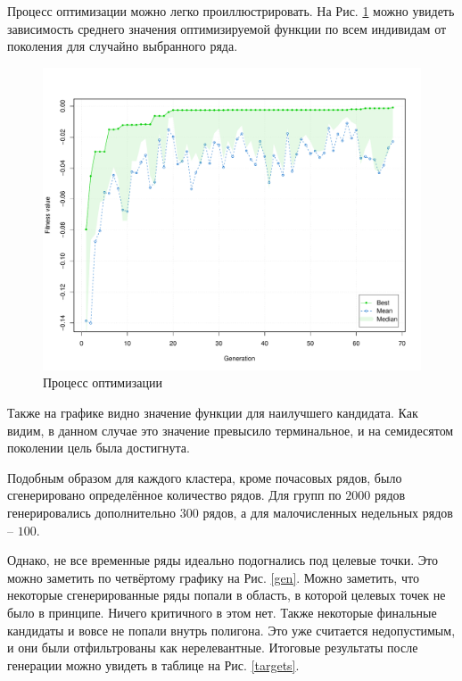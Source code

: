 \documentclass[a4paper,12pt]{article}
\begin{document}
Процесс оптимизации можно легко проиллюстрировать. На Рис. \ref{optim} можно увидеть зависимость среднего значения оптимизируемой функции по всем индивидам от поколения для случайно выбранного ряда. 
\begin{figure}[!h]
	\begin{center}
		\includegraphics[width=0.8
		\textwidth]{optim}%
		\caption{Процесс оптимизации}
		\label{optim}
	\end{center}
\end{figure} 

Также на графике видно значение функции для наилучшего кандидата. Как видим, в данном случае это значение превысило терминальное, и на семидесятом поколении цель была достигнута. 


Подобным образом для каждого кластера, кроме почасовых рядов, было сгенерировано определённое количество рядов. Для групп по $ 2000 $ рядов генерировались дополнительно $ 300 $ рядов, а для малочисленных недельных рядов -- $ 100 $.

 Однако, не все временные ряды идеально подогнались под целевые точки. Это можно заметить по четвёртому графику на Рис. \ref{gen}. Можно заметить, что некоторые сгенерированные ряды попали в область, в которой целевых точек не было в принципе. Ничего критичного в этом нет. Также некоторые финальные кандидаты и вовсе не попали внутрь полигона. Это уже считается недопустимым, и они были отфильтрованы как нерелевантные. Итоговые результаты после генерации можно увидеть в таблице на Рис. \ref{targets}.
 
\end{document}
